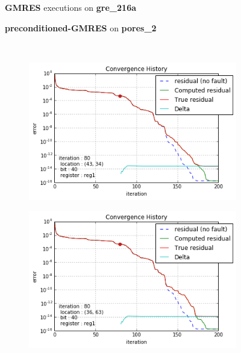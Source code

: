 \begin{figure}[h]
	\centering
    
\begin{minipage}[b]{0.45\linewidth}
\centering
\textbf{GMRES} executions on \textbf{gre_216a} 
\end{minipage}
\quad
\begin{minipage}{0.45\linewidth}
\centering
\textbf{preconditioned-GMRES} on \textbf{pores_2}
\end{minipage}\\


    \begin{minipage}[b]{0.48\linewidth}
	\begin{subfigure}[t]{\linewidth}
		\centering
		\includegraphics[width=\linewidth]{figures/gre_216a/convergence_history_location_0.png}
		\caption{}\label{fig:gre_216a_conv_hist_location_0}		
	\end{subfigure}
	\quad
	\begin{subfigure}[t]{\linewidth}
		\centering
		\includegraphics[width=\linewidth]{figures/gre_216a/convergence_history_location_1.png}

\end{subfigure}
\end{minipage}
\end{figure}
